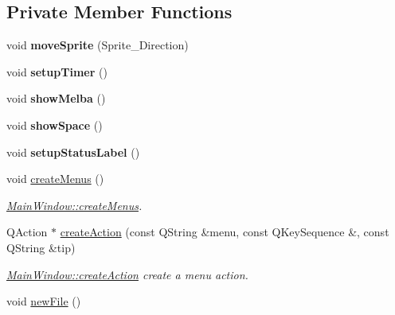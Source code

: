 \subsection*{Private Member Functions}
\begin{DoxyCompactItemize}
\item 
\mbox{\label{class_main_window_ad241698f69fdcf66d792f8ce6064a154}} 
void {\bfseries move\+Sprite} (Sprite\+\_\+\+Direction)
\item 
\mbox{\label{class_main_window_ad3776dfddc6ea10ce6331f1c142ac1ac}} 
void {\bfseries setup\+Timer} ()
\item 
\mbox{\label{class_main_window_a56ac2c93f1c691df939808c909140eb1}} 
void {\bfseries show\+Melba} ()
\item 
\mbox{\label{class_main_window_acf0d2ef2d17eb4b58e77b24574a244fd}} 
void {\bfseries show\+Space} ()
\item 
\mbox{\label{class_main_window_a354de8b79b7996530d6689c1a68cf858}} 
void {\bfseries setup\+Status\+Label} ()
\item 
\mbox{\label{class_main_window_aa4907b0251d305659e403c62921ef331}} 
void \hyperlink{class_main_window_aa4907b0251d305659e403c62921ef331}{create\+Menus} ()
\begin{DoxyCompactList}\small\item\em \hyperlink{class_main_window_aa4907b0251d305659e403c62921ef331}{Main\+Window\+::create\+Menus}. \end{DoxyCompactList}\item 
Q\+Action $\ast$ \hyperlink{class_main_window_a5916e4c4ce07f6de5e084d0cd27d81c2}{create\+Action} (const Q\+String \&menu, const Q\+Key\+Sequence \&, const Q\+String \&tip)
\begin{DoxyCompactList}\small\item\em \hyperlink{class_main_window_a5916e4c4ce07f6de5e084d0cd27d81c2}{Main\+Window\+::create\+Action} create a menu action. \end{DoxyCompactList}\item 
\mbox{\label{class_main_window_a69f73b93cc05c89a9ae1be0161105982}} 
void \hyperlink{class_main_window_a69f73b93cc05c89a9ae1be0161105982}{new\+File} ()

\end{DoxyCompactItemize}

